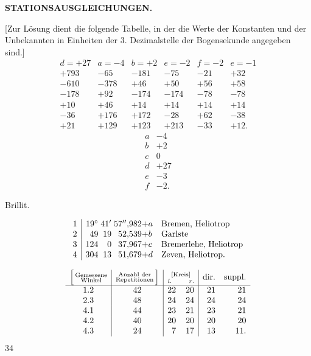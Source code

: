 \par\clearpage
\noindent\null\hfill{\small\textbf{STATIONSAUSGLEICHUNGEN.}}\hfill{}\par\medskip

[Zur Lösung dient die folgende Tabelle, in der die Werte der Konstanten und der Unbekannten in Einheiten der 3. Dezimalstelle der Bogensekunde angegeben sind.]
\[
\begin{array}{c|c|c|c|c|c}
 d=+27&a=-4&b=+2&e=-2&f=-2&e=-1\\
 \hline
 +793&-65&-181&-75&-21&+32\\
 -610&-378&+46&+50&+56&+58\\
 -178&+92&-174&-174&-78&-78\\
 +10&+46&+14&+14&+14&+14\\
 -36&+176&+172&-28&+62&-38\\
 +21&+129&+123&+213&-33&+12.
\end{array}
\]
\[
\begin{array}{r|r}
 a&-4\\
 b&+2\\
 c&0\\
 d&+27\\
 e&-3\\
 f&-2.
\end{array}
\]

\medskip
{\centering
[2.]\par{} Brillit.\par{}\par}
\[
\begin{array}{@{}r|r@{\;}r@{\;}r@{}l@{\quad}l@{}}
 1&19^\circ&41'&57''{,}982&+a&\text{Bremen, Heliotrop}\\
 2&49&19&52{,}539&+b&\text{Garlste}\\
 3&124&0&37{,}967&+c&\text{Bremerlehe, Heliotrop}\\
 4&304&13&51{,}679&+d&\text{Zeven, Heliotrop.}
\end{array}
\]
{\centering[Beobachtungstabelle.]\par}
{\small
\[
\begin{array}{c|c|rr|rr}
 \Bigl[\,\substack{\text{Gemessene}\\\text{Winkel}}&
 \substack{\text{Anzahl der}\\\text{Repetitionen}}\,\Bigr]&
 \multicolumn{2}{c|}{\substack{\text{[Kreis]}\\\mathit{l.}\qquad\mathit{r.}}}&
 \text{dir.}&\text{suppl.}\\
 \hline
 1.2&42&22&20&21&21\\
 2.3&48&24&24&24&24\\
 4.1&44&23&21&23&21\\
 4.2&40&20&20&20&20\\
 4.3&24&7&17&13&11.
\end{array}
\]
}
\hfill{\small 34}\hspace*{.12\linewidth}\par

